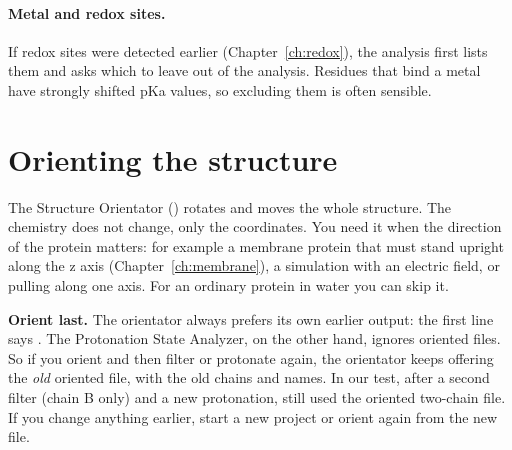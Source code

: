 \paragraph{Metal and redox sites.} If redox sites were detected earlier
(Chapter~\ref{ch:redox}), the analysis first lists them and asks which to leave
out of the analysis. Residues that bind a metal have strongly shifted pKa
values, so excluding them is often sensible.

\section{Orienting the structure}
\label{sec:protonation-orient}

The Structure Orientator () rotates and moves the whole structure. The
chemistry does not change, only the coordinates. You need it when the direction
of the protein matters: for example a membrane protein that must stand upright
along the z axis (Chapter~\ref{ch:membrane}), a simulation with an electric
field, or pulling along one axis. For an ordinary protein in water you can skip
it.

\begin{watchout}
\textbf{Orient last.} The orientator always prefers its own earlier output: the
first line says . The Protonation State
Analyzer, on the other hand, ignores oriented files. So if you orient and then
filter or protonate again, the orientator keeps offering the \emph{old}
oriented file, with the old chains and names. In our test, after a second
filter (chain B only) and a new protonation,  still used the oriented
two-chain file. If you change anything earlier, start a new project or orient
again from the new file.
\end{watchout}


